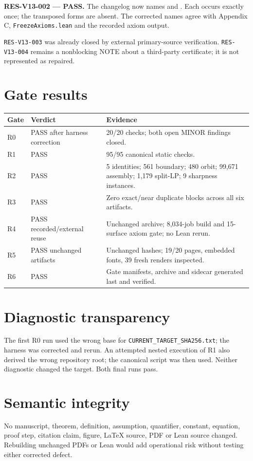 \documentclass[11pt]{article}
\begin{document}
\textbf{RES-V13-002 --- PASS.} The changelog now names
 and
. Each occurs exactly once; the
transposed forms are absent. The corrected names agree with Appendix C,
\texttt{FreezeAxioms.lean} and the recorded axiom output.

\texttt{RES-V13-003} was already closed by external primary-source
verification. \texttt{RES-V13-004} remains a nonblocking NOTE about a
third-party certificate; it is not represented as repaired.

\section{Gate results}
\small
\begin{longtable}{p{.09\linewidth}p{.25\linewidth}p{.57\linewidth}}
\toprule Gate & Verdict & Evidence \\ \midrule
R0 & PASS after harness correction & 20/20 checks; both open MINOR findings closed. \\
R1 & PASS & 95/95 canonical static checks. \\
R2 & PASS & 5 identities; 561 boundary; 480 orbit; 99,671 assembly; 1,179 split-LP; 9 sharpness instances. \\
R3 & PASS & Zero exact/near duplicate blocks across all six artifacts. \\
R4 & PASS recorded/external reuse & Unchanged archive; 8,034-job build and 15-surface axiom gate; no Lean rerun. \\
R5 & PASS unchanged artifacts & Unchanged hashes; 19/20 pages, embedded fonts, 39 fresh renders inspected. \\
R6 & PASS & Gate manifests, archive and sidecar generated last and verified. \\
\bottomrule
\end{longtable}
\normalsize

\section{Diagnostic transparency}
The first R0 run used the wrong base for
\texttt{CURRENT\_TARGET\_SHA256.txt}; the harness was corrected and rerun. An
attempted nested execution of R1 also derived the wrong repository root; the
canonical script was then used. Neither diagnostic changed the target. Both
final runs pass.

\section{Semantic integrity}
No manuscript, theorem, definition, assumption, quantifier, constant, equation,
proof step, citation claim, figure, LaTeX source, PDF or Lean source changed.
Rebuilding unchanged PDFs or Lean would add operational risk without testing
either corrected defect.
\end{document}
